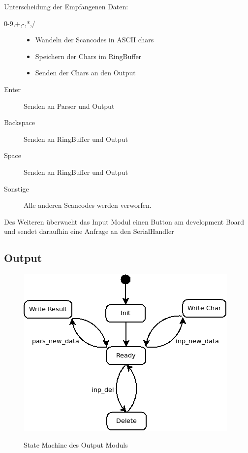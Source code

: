 Unterscheidung der Empfangenen Daten:
\begin{description}
 \item[0-9,+,-,*,/]
	\begin{itemize}
		\item Wandeln der Scancodes in ASCII chars 
		\item Speichern der Chars im RingBuffer
		\item Senden der Chars an den Output
	\end{itemize}
 \item[Enter] Senden an Parser und Output
 \item[Backspace] Senden an RingBuffer und Output
 \item[Space] Senden an RingBuffer und Output
 \item[Sonstige] Alle anderen Scancodes werden verworfen.
 \end{description}

Des Weiteren überwacht das Input Modul einen Button am development Board und sendet
daraufhin eine Anfrage an den SerialHandler

\subsection{Output}

\begin{figure}[!ht]
 \caption{State Machine des Output Moduls}
 \centering
 \includegraphics[scale=0.55]{pics/Output.png}
 \label{fig:Modules}
\end{figure}

